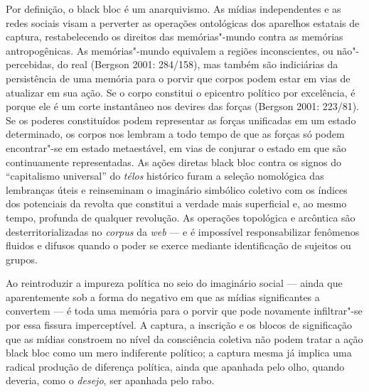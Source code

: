 Por definição, o black bloc é um anarquivismo. As mídias independentes e
as redes sociais visam a perverter as operações ontológicas dos
aparelhos estatais de captura, restabelecendo os direitos das
memórias"-mundo contra as memórias antropogênicas. As memórias"-mundo
equivalem a regiões inconscientes, ou não"-percebidas, do real (Bergson
2001: 284/158), mas também são indiciárias da persistência de uma
memória para o porvir que corpos podem estar em vias de atualizar em sua
ação. Se o corpo constitui o epicentro político por excelência, é porque
ele é um corte instantâneo nos devires das forças (Bergson 2001:
223/81). Se os poderes constituídos podem representar as forças
unificadas em um estado determinado, os corpos nos lembram a todo tempo
de que as forças só podem encontrar"-se em estado metaestável, em vias de
conjurar o estado em que são continuamente representadas. As ações
diretas black bloc contra os signos do ``capitalismo universal'' do
\emph{télos }histórico furam a seleção nomológica das lembranças úteis e
reinseminam o imaginário simbólico coletivo com os índices dos
potenciais da revolta que constitui a verdade mais superficial e, ao
mesmo tempo, profunda de qualquer revolução. As operações topológica e
arcôntica são desterritorializadas no \emph{corpus} da \emph{web} --- e é
impossível responsabilizar fenômenos fluidos e difusos quando o poder se
exerce mediante identificação de sujeitos ou grupos.

Ao reintroduzir a impureza política no seio do imaginário social ---
ainda que aparentemente sob a forma do negativo em que as mídias
significantes a convertem --- é toda uma memória para o porvir que pode
novamente infiltrar"-se por essa fissura imperceptível. A captura, a
inscrição e os blocos de significação que as mídias constroem no nível
da consciência coletiva não podem tratar a ação black bloc como um mero
indiferente político; a captura mesma já implica uma radical produção de
diferença política, ainda que apanhada pelo olho, quando deveria, como o
\emph{desejo}, ser apanhada pelo rabo.

